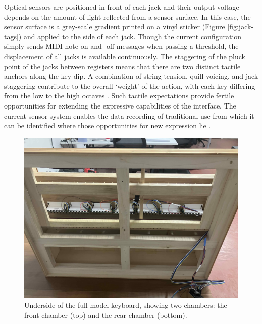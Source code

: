 Optical sensors are positioned in front of each jack and their output voltage depends on the amount of light reflected from a sensor surface. In this case, the sensor surface is a grey-scale gradient printed on a vinyl sticker (Figure \ref{fig:jack-tags}) and applied to the side of each jack. Though the current configuration simply sends MIDI note-on and -off messages when passing a threshold, the displacement of all jacks is available continuously.
The staggering of the pluck point of the jacks between registers means that there are two distinct tactile anchors along the key dip. A combination of string tension, quill voicing, and jack staggering contribute to the overall `weight' of the action, with each key differing from the low to the high octaves \cite{Veroli2012}. Such tactile expectations provide fertile opportunities for extending the expressive capabilities of the interface. The current sensor system enables the data recording of traditional use from which it can be identified where those opportunities for new expression lie \cite{McPherson2013-2}.


\begin{figure}
  \centering
  \includegraphics[width=\linewidth]{src/images/49-key-bottom-sensors-no-keys.jpg} 
  \caption{Underside of the full model keyboard, showing two chambers: the front chamber (top) and the rear chamber (bottom).} 
  \Description{} 
  \label{fig:49-key-bottom}
\end{figure}

